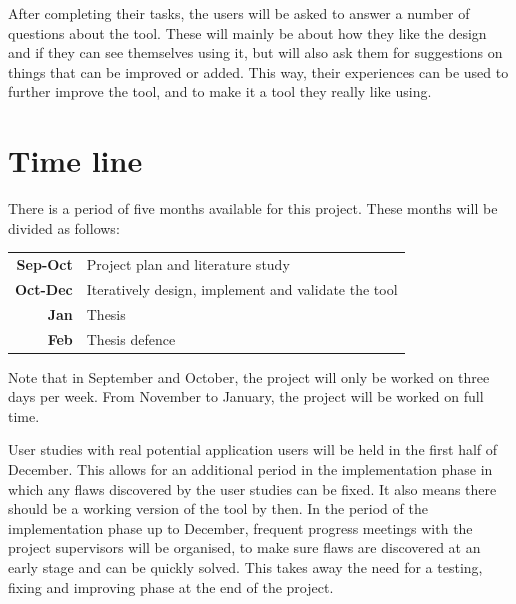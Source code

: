 After completing their tasks, the users will be asked to answer a number of questions about the tool. These will mainly be about how they like the design and if they can see themselves using it, but will also ask them for suggestions on things that can be improved or added. This way, their experiences can be used to further improve the tool, and to make it a tool they really like using.


\section{Time line}

There is a period of five months available for this project. These months will be divided as follows:

\noindent
\begin{tabular}{r|l}
\textbf{Sep-Oct} & Project plan and literature study\\
\textbf{Oct-Dec} & Iteratively design, implement and validate the tool\\
\textbf{Jan} & Thesis\\
\textbf{Feb} & Thesis defence
\end{tabular}

\noindent
Note that in September and October, the project will only be worked on three days per week. From November to January, the project will be worked on full time.

User studies with real potential application users will be held in the first half of December. This allows for an additional period in the implementation phase in which any flaws discovered by the user studies can be fixed. It also means there should be a working version of the tool by then. In the period of the implementation phase up to December, frequent progress meetings with the project supervisors will be organised, to make sure flaws are discovered at an early stage and can be quickly solved. This takes away the need for a testing, fixing and improving phase at the end of the project.
